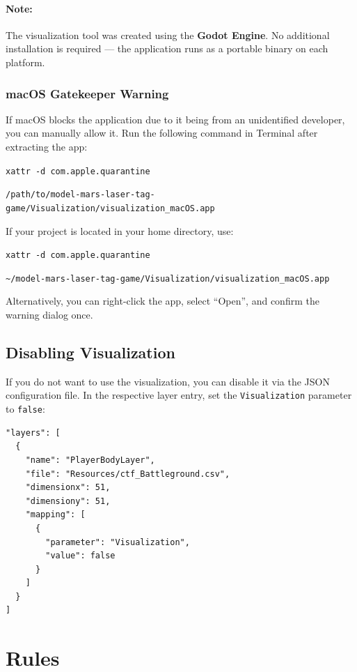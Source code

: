 \documentclass[a4paper,english,DIV=16,11pt,parskip=half,dvipsnames,listof=totoc,index=totoc,bibliography=totoc]{scrartcl}
\begin{document}
\paragraph{Note:}
The visualization tool was created using the \textbf{Godot Engine}. No additional installation is required — the application runs as a portable binary on each platform.

\subsubsection*{macOS Gatekeeper Warning}
If macOS blocks the application due to it being from an unidentified developer, you can manually allow it. Run the following command in Terminal after extracting the app:

\texttt{xattr -d com.apple.quarantine} 

\texttt{/path/to/model-mars-laser-tag-game/Visualization/visualization\_macOS.app}

If your project is located in your home directory, use:

\texttt{xattr -d com.apple.quarantine} 

\texttt{\textasciitilde/model-mars-laser-tag-game/Visualization/visualization\_macOS.app}

Alternatively, you can right-click the app, select “Open”, and confirm the warning dialog once.

\subsection{Disabling Visualization}
If you do not want to use the visualization, you can disable it via the JSON configuration file. In the respective layer entry, set the \texttt{Visualization} parameter to \texttt{false}:

\begin{lstlisting}
"layers": [
  {
    "name": "PlayerBodyLayer",
    "file": "Resources/ctf_Battleground.csv",
    "dimensionx": 51,
    "dimensiony": 51,
    "mapping": [
      {
        "parameter": "Visualization",
        "value": false
      }
    ]
  }
]
\end{lstlisting}

%
%
\section{Rules} \label{sec:rules}
%
\end{document}
